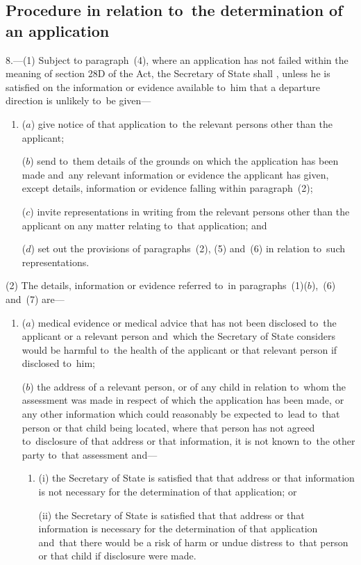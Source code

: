 \documentclass[12pt,a4paper]{article}
\begin{document}
\subsection[8. Procedure in relation to~the determination of an application]{Procedure in relation to~the determination of an application}

8.—(1) Subject to
paragraph~(4), where an application has not failed within the meaning of section
28D of the Act, the Secretary of State shall%
, unless he is satisfied on the information or evidence available to~him that a departure direction is unlikely to~be given—  %
\begin{enumerate}\item[]
($a$) give notice of that application to~the relevant persons other than the
applicant;

($b$) send to~them details of the grounds on which the application has been made
and~any relevant information or evidence the applicant has given, except
details, information or evidence falling within paragraph~(2);

($c$) invite representations in writing from the relevant persons other than the
applicant on any matter relating to~that application; and

($d$) set out the provisions of paragraphs~(2), (5) and~(6) in relation to~such
representations.
\end{enumerate}

(2) The details, information or evidence referred to~in paragraphs~(1)($b$),~(6)
and~(7) are—
\begin{enumerate}\item[]
($a$) medical evidence or medical advice that has not been disclosed to~the
applicant or a relevant person and~which the Secretary of State considers would
be harmful to~the health of the applicant or that relevant person if disclosed
to~him;

($b$) the address of a relevant person, or of any child in relation to~whom the
assessment was made in respect of which the application has been made, or any
other information which could reasonably be expected to~lead to~that person or
that child being located, where that person has not agreed to~disclosure of that
address or that information, it is not known to~the other party to~that
assessment and—
\begin{enumerate}\item[]
(i) the Secretary of State is satisfied that that address or that information is
not necessary for the determination of that application; or

(ii) the Secretary of State is satisfied that that address or that information is
necessary for the determination of that application and~that there would be a
risk of harm or undue distress to~that person or that child if disclosure were
made.
\end{enumerate}
\end{enumerate}
\end{document}
